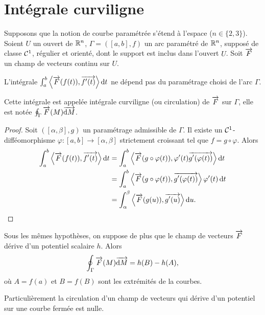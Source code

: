 \section{Intégrale curviligne}

Supposons que la notion de courbe paramétrée s'étend à l'espace ($n \in \{2, 3\}$). Soient $U$ un ouvert de $\mathbb{R}^n$, $\Gamma=([a,b], f)$ un arc paramétré de $\mathbb{R}^n$, supposé de classe $\mathcal{C}^{1}$, régulier et orienté, dont le support est inclus dans l'ouvert $U$. Soit $\overrightarrow{F}$ un champ de vecteurs continu sur $U$.

\begin{prop}
  L'intégrale $\int_a^b \left\langle{\overrightarrow{F}(f(t))},{\overrightarrow{f'(t)}}\right\rangle \mathop{}\mathopen{}\mathrm{d} t$ ne dépend pas du paramétrage choisi de l'arc $\Gamma$.
\end{prop}
\begin{defdef}
  Cette intégrale est appelée intégrale curviligne (ou circulation) de $\overrightarrow{F}$ sur $\Gamma$, elle est notée $\oint_\Gamma \overrightarrow{F}(M)\overrightarrow{\mathop{}\mathopen{}\mathrm{d} M}$.
\end{defdef}
\begin{proof}
  Soit $([\alpha, \beta], g)$ un paramétrage admissible de $\Gamma$. Il existe un $\mathcal{C}^{1}$-difféomorphisme $\varphi : [a, b] \rightarrow [\alpha, \beta]$ strictement croissant tel que $f=g \circ \varphi$.  Alors
  \begin{align}
    \int_a^b \left\langle{\overrightarrow{F}(f(t))},{\overrightarrow{f'(t)}}\right\rangle \mathop{}\mathopen{}\mathrm{d} t &= \int_a^b \left\langle{\overrightarrow{F}(g \circ \varphi(t))},{\varphi'(t)\overrightarrow{g'(\varphi(t))}}\right\rangle \mathop{}\mathopen{}\mathrm{d} t \\
    &=\int_a^b \left\langle{\overrightarrow{F}(g \circ \varphi(t))},{\overrightarrow{g'(\varphi(t))}}\right\rangle \varphi'(t)\mathop{}\mathopen{}\mathrm{d} t \\
    &=\int_\alpha^\beta \left\langle{\overrightarrow{F}(g(u))},{\overrightarrow{g'(u)}}\right\rangle \mathop{}\mathopen{}\mathrm{d} u.
  \end{align}
\end{proof}

\begin{prop}
  Sous les mêmes hypothèses, on suppose de plus que le champ de vecteurs $\overrightarrow{F}$ dérive d'un potentiel scalaire $h$. Alors
  \begin{equation}
    \oint_\Gamma \overrightarrow{F}(M)\overrightarrow{\mathop{}\mathopen{}\mathrm{d} M} = h(B)-h(A),
  \end{equation}
  où $A=f(a)$ et $B=f(B)$ sont les extrémités de la courbes.
\end{prop}

Particulièrement la circulation d'un champ de vecteurs qui dérive d'un potentiel sur une courbe fermée est nulle.

